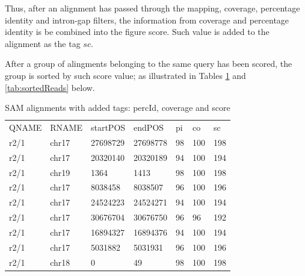 \documentclass[11pt]{article}
\newcommand{\option}[1]{{\fontfamily{phv}\selectfont#1}}
\begin{document}
{Thus, after an alignment has passed through the mapping, coverage, percentage identity and intron-gap 
filters, the information from coverage and percentage identity is be combined into the figure \option{score}.
Such value is added to the alignment as the tag $sc$. 

After a group of alingments belonging to the same query has been scored, the group is sorted by such score 
value; as illustrated in Tables \ref{tab:singleReads} and \ref{tab:sortedReads} below.

\begin{landscape}
  \begin{table}\footnotesize
\begin{center}
    \begin{tabular*}{0.75\textwidth}{|l|l|l|l|l|l|l|}
	\cline{1-7}
	  QNAME & RNAME & startPOS & endPOS & pi & co & sc \\ \cline{1-7}
      r2/1 & chr17 & 27698729 & 27698778 & 98 & 100 & 198 \\ \cline{1-7}
      r2/1 & chr17 & 20320140 & 20320189 & 94 & 100 & 194 \\ \cline{1-7}
      r2/1 & chr19 & 1364 & 1413 & 98 & 100 & 198 \\ \cline{1-7}
      r2/1 & chr17 & 8038458 & 8038507 & 96 & 100 & 196 \\ \cline{1-7}
      r2/1 & chr17 & 24524223 & 24524271 & 94 & 100 & 194 \\ \cline{1-7}
      r2/1 & chr17 & 30676704 & 30676750 & 96 & 96 & 192 \\ \cline{1-7}
      r2/1 & chr17 & 16894327 & 16894376 & 94 & 100 & 194 \\ \cline{1-7}
      r2/1 & chr17 & 5031882 & 5031931 & 96 & 100 & 196 \\ \cline{1-7}
      r2/1 & chr18 & 0 & 49 & 98 & 100 & 198 \\ \cline{1-7}
    \end{tabular*}
    \caption{SAM alignments with added tags: percId, coverage and score}
    \label{tab:singleReads}
\end{center}
  \end{table}



\end{landscape}}
\end{document}
